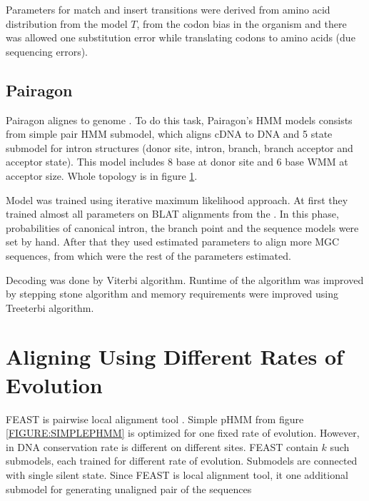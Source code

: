 Parameters for match and insert transitions were derived from amino acid
distribution from the model $T$, from the codon bias in the organism and there
was allowed one substitution error while translating codons to amino acids (due
sequencing errors).
  
\subsection{Pairagon}

Pairagon alignes  to  genome \cite{Pairagon2009}.
To do this task, Pairagon's HMM models consists from simple pair HMM submodel,
which aligns cDNA to DNA and 5 state submodel for intron structures (donor site,
intron, branch, branch acceptor and acceptor state). This model includes 8 base
 at donor site and 6 base WMM at
acceptor size. Whole topology is in figure \ref{}.

Model was trained using iterative maximum likelihood approach. At first they
trained almost all parameters on BLAT alignments from the
. In this phase, probabilities of
canonical intron, the branch point and the sequence models were set by hand.
After that they used estimated parameters to align more MGC sequences, from
which were the rest of the parameters estimated.

Decoding was done by Viterbi algorithm. Runtime of the algorithm was improved by
stepping stone algorithm \cite{} and memory requirements were improved using
Treeterbi algorithm. 

\section{Aligning Using Different Rates of Evolution}
 
FEAST is pairwise local alignment tool \cite{FEAST2011}. Simple pHMM from figure
\ref{FIGURE:SIMPLEPHMM} is optimized for one fixed rate of evolution. However,
in DNA conservation rate is different on different sites.  FEAST contain $k$
such submodels, each trained for different rate of evolution. Submodels are
connected with single silent state. Since FEAST is local alignment tool, it one
additional submodel for generating unaligned pair of the sequences 

